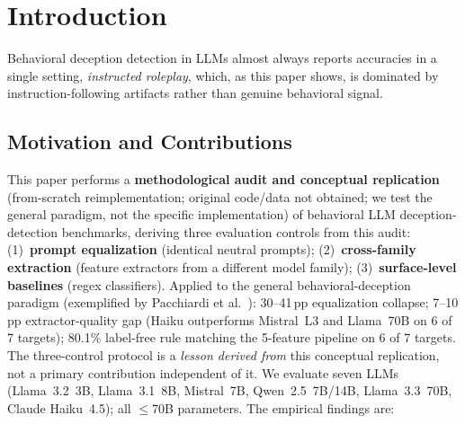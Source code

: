 \section{Introduction}

Behavioral deception detection in LLMs almost always reports accuracies in a single setting, \emph{instructed roleplay}, which, as this paper shows, is dominated by instruction-following artifacts rather than genuine behavioral signal.

\subsection{Motivation and Contributions}
\label{sec:motivation}

This paper performs a \textbf{methodological audit and conceptual replication} (from-scratch reimplementation; original code/data not obtained; we test the general paradigm, not the specific implementation) of behavioral LLM deception-detection benchmarks, deriving three evaluation controls from this audit: (1)~\textbf{prompt equalization} (identical neutral prompts); (2)~\textbf{cross-family extraction} (feature extractors from a different model family); (3)~\textbf{surface-level baselines} (regex classifiers). Applied to the general behavioral-deception paradigm (exemplified by Pacchiardi et al.~\citeyear{pacchiardi2023catch}): 30--41\,pp equalization collapse; 7--10\,pp extractor-quality gap (Haiku outperforms Mistral~L3 and Llama~70B on 6 of 7 targets); 80.1\% label-free rule matching the 5-feature pipeline on 6 of 7 targets. The three-control protocol is a \emph{lesson derived from} this conceptual replication, not a primary contribution independent of it. We evaluate seven LLMs (Llama~3.2~3B, Llama~3.1~8B, Mistral~7B, Qwen~2.5~7B/14B, Llama~3.3~70B, Claude Haiku~4.5); all $\leq$70B parameters. The empirical findings are:
